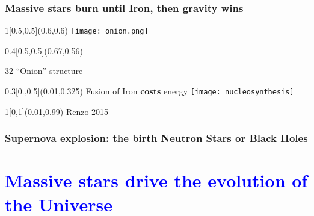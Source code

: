 \documentclass[xcolor=dvipsnames,professionalfonts, aspectratio=169]{beamer}
\begin{document}
\begin{frame}[c]
  \frametitle{Massive stars burn until Iron, then gravity wins}

  \begin{textblock}{1}[0.5,0.5](0.6,0.6)
    \centering
    \texttt{[image: onion.png]}
    \end{textblock}
\begin{textblock}{0.4}[0.5,0.5](0.67,0.56)
    \begin{rotate}{32}
      \centering
      ``Onion'' structure
    \end{rotate}
  \end{textblock}

  \begin{textblock}{0.3}[0.,0.5](0.01,0.325)
    \centering
    Fusion of Iron \textbf{costs} energy
    \texttt{[image: nucleosynthesis]}
  \end{textblock}

  \begin{textblock}{1}[0,1](0.01,0.99)
    \textcolor{gray!50}{\tiny Renzo 2015}\hfill\,
  \end{textblock}
\end{frame}

\begin{frame}
  \frametitle{Supernova explosion: the birth Neutron Stars or Black
    Holes }

\end{frame}


\AtBeginSection[]{}
\section*{\textcolor{Blue}{Massive stars drive the evolution of the Universe}}
\end{document}
